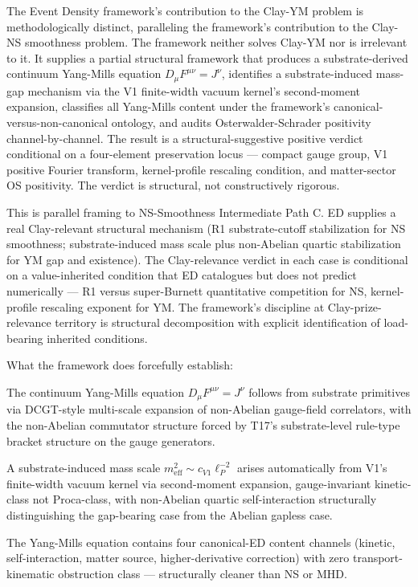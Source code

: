 \documentclass[11pt,a4paper]{article}
\begin{document}
The Event Density framework's contribution to the Clay-YM problem is methodologically distinct, paralleling the framework's contribution to the Clay-NS smoothness problem. The framework neither solves Clay-YM nor is irrelevant to it. It supplies a partial structural framework that produces a substrate-derived continuum Yang-Mills equation $D_\mu F^{\mu\nu} = J^\nu$, identifies a substrate-induced mass-gap mechanism via the V1 finite-width vacuum kernel's second-moment expansion, classifies all Yang-Mills content under the framework's canonical-versus-non-canonical ontology, and audits Osterwalder-Schrader positivity channel-by-channel. The result is a structural-suggestive positive verdict conditional on a four-element preservation locus --- compact gauge group, V1 positive Fourier transform, kernel-profile rescaling condition, and matter-sector OS positivity. The verdict is structural, not constructively rigorous.

This is parallel framing to NS-Smoothness Intermediate Path C. ED supplies a real Clay-relevant structural mechanism (R1 substrate-cutoff stabilization for NS smoothness; substrate-induced mass scale plus non-Abelian quartic stabilization for YM gap and existence). The Clay-relevance verdict in each case is conditional on a value-inherited condition that ED catalogues but does not predict numerically --- R1 versus super-Burnett quantitative competition for NS, kernel-profile rescaling exponent for YM. The framework's discipline at Clay-prize-relevance territory is structural decomposition with explicit identification of load-bearing inherited conditions.

What the framework does forcefully establish:

The continuum Yang-Mills equation $D_\mu F^{\mu\nu} = J^\nu$ follows from substrate primitives via DCGT-style multi-scale expansion of non-Abelian gauge-field correlators, with the non-Abelian commutator structure forced by T17's substrate-level rule-type bracket structure on the gauge generators.

A substrate-induced mass scale $m_\mathrm{eff}^{2} \sim c_{V1} \ell_P^{-2}$ arises automatically from V1's finite-width vacuum kernel via second-moment expansion, gauge-invariant kinetic-class not Proca-class, with non-Abelian quartic self-interaction structurally distinguishing the gap-bearing case from the Abelian gapless case.

The Yang-Mills equation contains four canonical-ED content channels (kinetic, self-interaction, matter source, higher-derivative correction) with zero transport-kinematic obstruction class --- structurally cleaner than NS or MHD.
\end{document}
